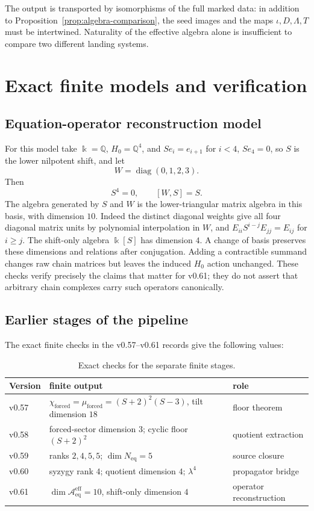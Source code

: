 \documentclass[11pt]{amsart}
\theoremstyle{definition}
\newcommand{\kk}{\Bbbk}
\newcommand{\Q}{\mathbb Q}
\newcommand{\Aeff}{\mathscr A_{\mathrm{eq}}^{\mathrm{eff}}}
\newcommand{\Neq}{N_{\mathrm{eq}}}
\newcommand{\forced}{\mathrm{forced}}
\begin{document}
The output is transported by isomorphisms of the full marked data: in addition
to Proposition~\ref{prop:algebra-comparison}, the seed images and the maps
\(\iota,D,\Lambda,T\) must be intertwined. Naturality of the effective algebra
alone is insufficient to compare two different landing systems.

\section{Exact finite models and verification}

\subsection{Equation-operator reconstruction model}

For this model take \(\kk=\Q\), \(H_0=\Q^4\), and
\(Se_i=e_{i+1}\) for \(i<4\), \(Se_4=0\), so \(S\) is the lower nilpotent shift, and let
\[
W=\operatorname{diag}(0,1,2,3).
\]
Then
\[
S^4=0,
\qquad
[W,S]=S.
\]
The algebra generated by \(S\) and \(W\) is the lower-triangular matrix algebra in this basis,
with dimension \(10\). Indeed the distinct diagonal weights give all four diagonal
matrix units by polynomial interpolation in \(W\), and
\(E_{ii}S^{i-j}E_{jj}=E_{ij}\) for \(i\ge j\).
The shift-only algebra \(\kk[S]\) has dimension \(4\). A change of basis
preserves these dimensions and relations after conjugation. Adding a contractible summand changes
raw chain matrices but leaves the induced \(H_0\) action unchanged. These checks verify precisely
the claims that matter for v0.61; they do not assert that arbitrary chain complexes carry such
operators canonically.

\subsection{Earlier stages of the pipeline}

The exact finite checks in the v0.57--v0.61 records \cite{PartIIIRecords}
give the following values:
\begin{table}[ht]
\centering
\caption{Exact checks for the separate finite stages.}
\label{tab:finite-checks}
\small
\begin{tabular}{@{}lll@{}}
\toprule
Version & finite output & role \\
\midrule
v0.57 & \(\chi_{\forced}=\mu_{\forced}=(S+2)^2(S-3)\), tilt dimension \(18\) & floor theorem \\
v0.58 & forced-sector dimension \(3\); cyclic floor \((S+2)^2\) & quotient extraction \\
v0.59 & ranks \(2,4,5,5\); \(\dim\Neq=5\) & source closure \\
v0.60 & syzygy rank \(4\); quotient dimension \(4\); \(\lambda^4\) & propagator bridge \\
v0.61 & \(\dim\Aeff=10\), shift-only dimension \(4\) & operator reconstruction \\
\bottomrule
\end{tabular}
\end{table}
\end{document}
